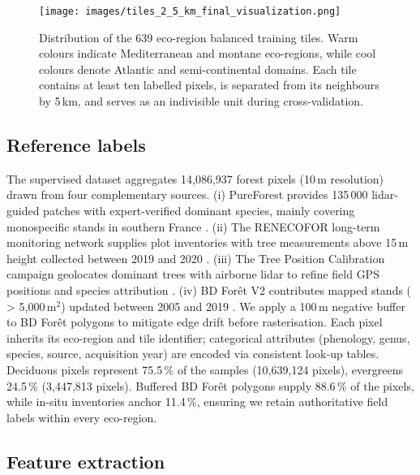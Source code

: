 \documentclass[utf8]{FrontiersinHarvard}
\begin{document}
\begin{figure}[H]
    \centering
    \texttt{[image: images/tiles\_2\_5\_km\_final\_visualization.png]}
    \caption{Distribution of the 639 eco-region balanced training tiles. Warm colours indicate Mediterranean and montane eco-regions, while cool colours denote Atlantic and semi-continental domains. Each tile contains at least ten labelled pixels, is separated from its neighbours by 5\,km, and serves as an indivisible unit during cross-validation.}
    \label{fig:training_tiles}
\end{figure}

\subsection{Reference labels}
The supervised dataset aggregates 14{,}086{,}937 forest pixels (10\,m resolution) drawn from four complementary sources. (i) PureForest provides 135\,000 lidar-guided patches with expert-verified dominant species, mainly covering monospecific stands in southern France \citep{gaydon2024pureforestlargescaleaeriallidar}. (ii) The RENECOFOR long-term monitoring network supplies plot inventories with tree measurements above 15\,m height collected between 2019 and 2020 \citep{ulrich:hal-03444393}. (iii) The Tree Position Calibration campaign geolocates dominant trees with airborne lidar to refine field GPS positions and species attribution \citep{ONF,IGN_LiDARHD}. (iv) BD Forêt V2 contributes mapped stands ( > 5{,}000\,m$^2$) updated between 2005 and 2019 \citep{IGN2024}. We apply a 100\,m negative buffer to BD Forêt polygons to mitigate edge drift before rasterisation. Each pixel inherits its eco-region and tile identifier; categorical attributes (phenology, genus, species, source, acquisition year) are encoded via consistent look-up tables. Deciduous pixels represent 75.5\,\% of the samples (10{,}639{,}124 pixels), evergreens 24.5\,\% (3{,}447{,}813 pixels). Buffered BD Forêt polygons supply 88.6\,\% of the pixels, while in-situ inventories anchor 11.4\,\%, ensuring we retain authoritative field labels within every eco-region.

\subsection{Feature extraction}
\end{document}
